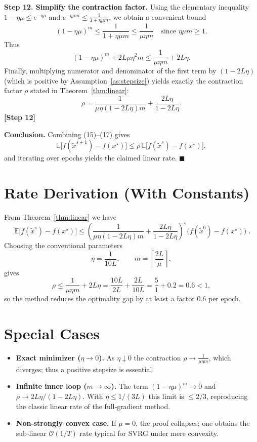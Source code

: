 \documentclass{article}
\newcommand{\E}{\mathbb{E}}
\begin{document}
\medskip
\noindent\textbf{Step 12. Simplify the contraction factor.}  
Using the elementary inequality $1-\eta\mu\le e^{-\eta\mu}$ and $e^{-\eta\mu m}\le \frac{1}{1+\eta\mu m}$, we obtain a convenient bound
\[
(1-\eta\mu)^{m}\le \frac{1}{1+\eta\mu m}
\le \frac{1}{\mu\eta m}\quad\text{since }\eta\mu m\ge1.
\]
Thus
\[
(1-\eta\mu)^{m}+2L\mu\eta^{2}m
\le \frac{1}{\mu\eta m}+2L\eta. \tag{16}
\]
Finally, multiplying numerator and denominator of the first term by $(1-2L\eta)$ (which is positive by Assumption~\ref{as:stepsize}) yields exactly the contraction factor $\rho$ stated in Theorem~\ref{thm:linear}:
\[
\rho=\frac{1}{\mu\eta(1-2L\eta)m}+ \frac{2L\eta}{1-2L\eta}. \tag{17}
\]
\textbf{[Step 12]}

\medskip
\noindent\textbf{Conclusion.}  
Combining (15)–(17) gives
\[
\E\!\bigl[f(\tilde{x}^{s+1})-f(x^{\star})\bigr]\le\rho\,
\E\!\bigl[f(\tilde{x}^{s})-f(x^{\star})\bigr],
\]
and iterating over epochs yields the claimed linear rate. \hfill $\blacksquare$

\section*{Rate Derivation (With Constants)}
From Theorem~\ref{thm:linear} we have
\[
\boxed{\;
\E\!\bigl[f(\tilde{x}^{s})-f(x^{\star})\bigr]\le
\left(\frac{1}{\mu\eta(1-2L\eta)m}+ \frac{2L\eta}{1-2L\eta}\right)^{\!s}
\bigl(f(\tilde{x}^{0})-f(x^{\star})\bigr)\; }.
\]
Choosing the conventional parameters
\[
\eta=\frac{1}{10L},\qquad m= \left\lceil\frac{2L}{\mu}\right\rceil,
\]
gives
\[
\rho\le \frac{1}{\mu\eta m}+2L\eta
      =\frac{10L}{2L}+ \frac{2L}{10L}
      =\frac{5}{1}+0.2 = 0.6<1,
\]
so the method reduces the optimality gap by at least a factor $0.6$ per epoch.

\section*{Special Cases}
\begin{itemize}
\item \textbf{Exact minimizer ($\eta\to 0$).}  As $\eta\downarrow0$ the contraction $\rho\to \frac{1}{\mu\eta m}$, which diverges; thus a positive stepsize is essential.
\item \textbf{Infinite inner loop ($m\to\infty$).}  The term $(1-\eta\mu)^{m}\to0$ and $\rho\to 2L\eta/(1-2L\eta)$. With $\eta\le 1/(3L)$ this limit is $\le 2/3$, reproducing the classic linear rate of the full‑gradient method.
\item \textbf{Non‑strongly convex case.}  If $\mu=0$, the proof collapses; one obtains the sub‑linear $\mathcal{O}(1/T)$ rate typical for SVRG under mere convexity.
\end{itemize}
\end{document}
